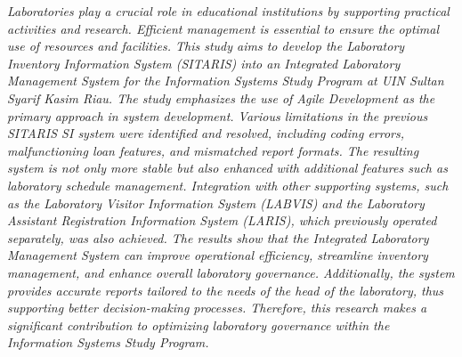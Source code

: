 \noindent
\fontsize{10pt}{12pt}\selectfont
\emph{Laboratories play a crucial role in educational institutions by supporting practical activities and research. Efficient management is essential to ensure the optimal use of resources and facilities. This study aims to develop the Laboratory Inventory Information System (SITARIS) into an Integrated Laboratory Management System for the Information Systems Study Program at UIN Sultan Syarif Kasim Riau. The study emphasizes the use of Agile Development as the primary approach in system development. Various limitations in the previous SITARIS SI system were identified and resolved, including coding errors, malfunctioning loan features, and mismatched report formats. The resulting system is not only more stable but also enhanced with additional features such as laboratory schedule management. Integration with other supporting systems, such as the Laboratory Visitor Information System (LABVIS) and the Laboratory Assistant Registration Information System (LARIS), which previously operated separately, was also achieved. The results show that the Integrated Laboratory Management System can improve operational efficiency, streamline inventory management, and enhance overall laboratory governance. Additionally, the system provides accurate reports tailored to the needs of the head of the laboratory, thus supporting better decision-making processes. Therefore, this research makes a significant contribution to optimizing laboratory governance within the Information Systems Study Program.}\\
 \\